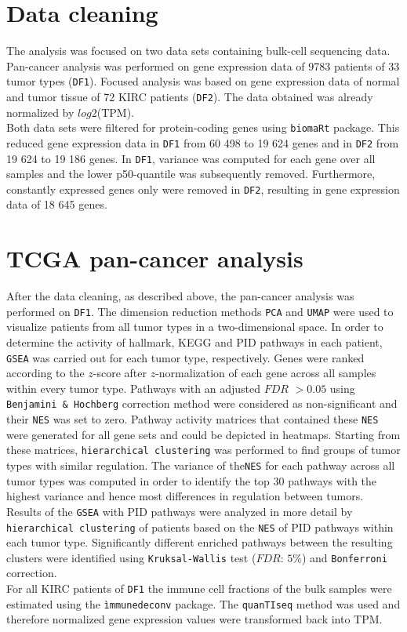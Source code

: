 \documentclass[
  parskip,
  oneside]{scrreprt}
\begin{document}
\hypertarget{data-cleaning}{%
\section{Data cleaning}\label{data-cleaning}}

The analysis was focused on two data sets containing bulk-cell
sequencing data. Pan-cancer analysis was performed on gene expression
data of 9783 patients of 33 tumor types (\texttt{DF1}). Focused analysis
was based on gene expression data of normal and tumor tissue of 72 KIRC
patients (\texttt{DF2}). The data obtained was already normalized by
\(log2\)(TPM).\\
Both data sets were filtered for protein-coding genes using
\texttt{biomaRt} package. This reduced gene expression data in
\texttt{DF1} from 60 498 to 19 624 genes and in \texttt{DF2} from 19 624
to 19 186 genes. In \texttt{DF1}, variance was computed for each gene
over all samples and the lower p50-quantile was subsequently removed.
Furthermore, constantly expressed genes only were removed in
\texttt{DF2}, resulting in gene expression data of 18 645 genes.

\hypertarget{tcga-pan-cancer-analysis}{%
\section{TCGA pan-cancer analysis}\label{tcga-pan-cancer-analysis}}

After the data cleaning, as described above, the pan-cancer analysis was
performed on \texttt{DF1}. The dimension reduction methods \texttt{PCA}
and \texttt{UMAP} were used to visualize patients from all tumor types
in a two-dimensional space. In order to determine the activity of
hallmark, KEGG and PID pathways in each patient, \texttt{GSEA} was
carried out for each tumor type, respectively. Genes were ranked
according to the \(z\)-score after \(z\)-normalization of each gene
across all samples within every tumor type. Pathways with an adjusted
\(FDR\) \(>0.05\) using \texttt{Benjamini\ \&\ Hochberg} correction
method were considered as non-significant and their \texttt{NES} was set
to zero. Pathway activity matrices that contained these \texttt{NES}
were generated for all gene sets and could be depicted in heatmaps.
Starting from these matrices, \texttt{hierarchical\ clustering} was
performed to find groups of tumor types with similar regulation. The
variance of the\texttt{NES} for each pathway across all tumor types was
computed in order to identify the top 30 pathways with the highest
variance and hence most differences in regulation between tumors.
Results of the \texttt{GSEA} with PID pathways were analyzed in more
detail by \texttt{hierarchical\ clustering} of patients based on the
\texttt{NES} of PID pathways within each tumor type. Significantly
different enriched pathways between the resulting clusters were
identified using \texttt{Kruksal-Wallis} test (\(FDR\): \(5\%\)) and
\texttt{Bonferroni} correction.\\
For all KIRC patients of \texttt{DF1} the immune cell fractions of the
bulk samples were estimated using the \texttt{ìmmunedeconv} package. The
\texttt{quanTIseq} method was used and therefore normalized gene
expression values were transformed back into TPM.
\end{document}
